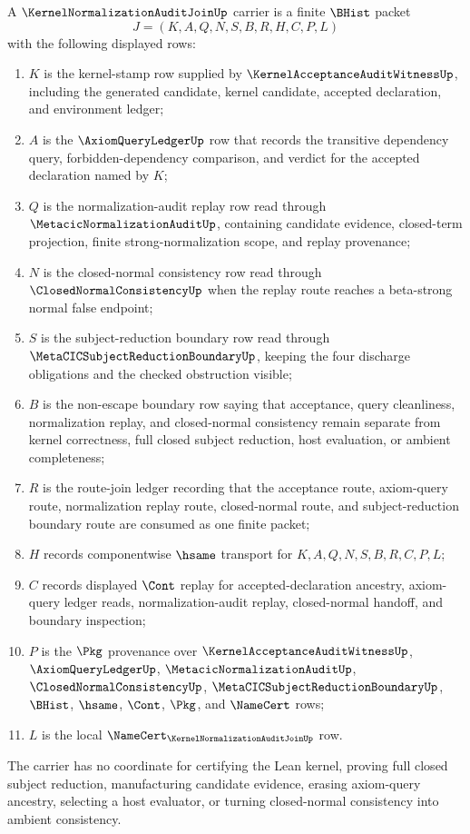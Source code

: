 \begin{definition}
\label{def:kernel-normalization-audit-join-carrier}
A $\KernelNormalizationAuditJoinUp$ carrier is a finite $\BHist$ packet
$$
J=(K,A,Q,N,S,B,R,H,C,P,L)
$$
with the following displayed rows:
\begin{enumerate}
\item $K$ is the kernel-stamp row supplied by $\KernelAcceptanceAuditWitnessUp$, including the generated candidate, kernel candidate, accepted declaration, and environment ledger;
\item $A$ is the $\AxiomQueryLedgerUp$ row that records the transitive dependency query, forbidden-dependency comparison, and verdict for the accepted declaration named by $K$;
\item $Q$ is the normalization-audit replay row read through $\MetacicNormalizationAuditUp$, containing candidate evidence, closed-term projection, finite strong-normalization scope, and replay provenance;
\item $N$ is the closed-normal consistency row read through $\ClosedNormalConsistencyUp$ when the replay route reaches a beta-strong normal false endpoint;
\item $S$ is the subject-reduction boundary row read through $\MetaCICSubjectReductionBoundaryUp$, keeping the four discharge obligations and the checked obstruction visible;
\item $B$ is the non-escape boundary row saying that acceptance, query cleanliness, normalization replay, and closed-normal consistency remain separate from kernel correctness, full closed subject reduction, host evaluation, or ambient completeness;
\item $R$ is the route-join ledger recording that the acceptance route, axiom-query route, normalization replay route, closed-normal route, and subject-reduction boundary route are consumed as one finite packet;
\item $H$ records componentwise $\hsame$ transport for $K,A,Q,N,S,B,R,C,P,L$;
\item $C$ records displayed $\Cont$ replay for accepted-declaration ancestry, axiom-query ledger reads, normalization-audit replay, closed-normal handoff, and boundary inspection;
\item $P$ is the $\Pkg$ provenance over $\KernelAcceptanceAuditWitnessUp$, $\AxiomQueryLedgerUp$, $\MetacicNormalizationAuditUp$, $\ClosedNormalConsistencyUp$, $\MetaCICSubjectReductionBoundaryUp$, $\BHist$, $\hsame$, $\Cont$, $\Pkg$, and $\NameCert$ rows;
\item $L$ is the local $\NameCert_{\KernelNormalizationAuditJoinUp}$ row.
\end{enumerate}
The carrier has no coordinate for certifying the Lean kernel, proving full closed subject reduction, manufacturing candidate evidence, erasing axiom-query ancestry, selecting a host evaluator, or turning closed-normal consistency into ambient consistency.
\end{definition}

